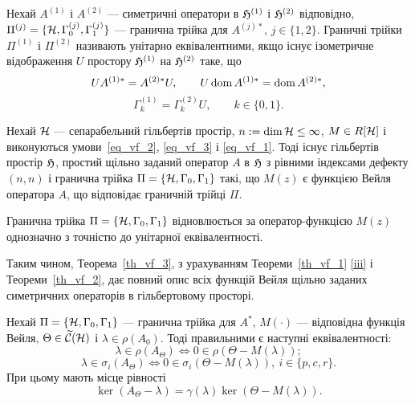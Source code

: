\begin{definition}
	Нехай $A^{(1)}$ і $A^{(2)}$ --- симетричні оператори в $\mathfrak{H}^{(1)}$ і $\mathfrak{H}^{(2)}$ відповідно, $\Pi^{(j)} = \{\mathcal{H}, \Gamma^{(j)}_0,\Gamma^{(j)}_1\}$ --- гранична трійка для $A^{(j)*}$, $j \in \{1,2\}$. Граничні трійки $\Pi^{(1)}$ і $\Pi^{(2)}$ називають унітарно еквівалентними, якщо існує ізометричне відображення $U$ простору $\mathfrak{H}^{(1)}$ на $\mathfrak{H}^{(2)}$ таке, що
	\begin{equation}
		UA^{(1)*} = A^{(2)*}U, \qquad U\operatorname{dom} A^{(1)*} = \operatorname{dom} A^{(2)*},
	\end{equation}
	\begin{equation}
		\Gamma^{(1)}_k = \Gamma^{(2)}_k U, \qquad k \in \{0,1\}.
	\end{equation}
\end{definition}

\begin{theorem} \label{th_vf_3}
	Нехай $\mathcal{H}$ --- сепарабельний гільбертів простір, $n:=\dim \mathcal{H} \le \infty$, $M \in R[\mathcal{H}]$ і виконуються умови~\eqref{eq_vf_2}, \eqref{eq_vf_3} і \eqref{eq_vf_1}. Тоді існує гільбертів простір $\mathfrak{H}$, простий щільно заданий оператор $A$ в $\mathfrak{H}$ з рівними індексами дефекту $(n,n)$ і гранична трійка $\Pi = \{\mathcal{H}, \Gamma_0, \Gamma_1\}$ такі, що $M(z)$ є функцією Вейля оператора $A$, що відповідає граничній трійці $\Pi$.

	Гранична трійка $\Pi = \{\mathcal{H}, \Gamma_0, \Gamma_1\}$ відновлюється за оператор-функцією $M(z)$ однозначно з точністю до унітарної еквівалентності. 
\end{theorem}

Таким чином, Теорема~\ref{th_vf_3}, з урахуванням Теореми~\ref{th_vf_1} \eqref{iii} і Теореми~\ref{th_vf_2}, дає повний опис всіх функцій Вейля щільно заданих симетричних операторів в гільбертовому просторі.

\begin{theorem}
	Нехай $\Pi=\{\mathcal{H},\Gamma_0,\Gamma_1\}$ --- гранична трійка для $A^*$, $M(\cdot)$ --- відповідна функція Вейля, $\Theta \in \widetilde{\mathcal{C}}(\mathcal{H})$ і $\lambda \in \rho(A_0)$. Тоді правильними є наступні еквівалентності:
	\begin{equation*}
		\lambda \in \rho(A_\Theta) \Longleftrightarrow 0 \in \rho(\Theta - M(\lambda));
	\end{equation*}
	\begin{equation*}
		\lambda\in \sigma_i(A_\Theta) \Longleftrightarrow 0 \in \sigma_i(\Theta - M(\lambda)), \ i \in \{p,c,r\}.
	\end{equation*}
	При цьому мають місце рівності
	\begin{equation*}
		\ker (A_\Theta - \lambda) = \gamma(\lambda)\ker(\Theta - M(\lambda)). 
	\end{equation*}
\end{theorem}

